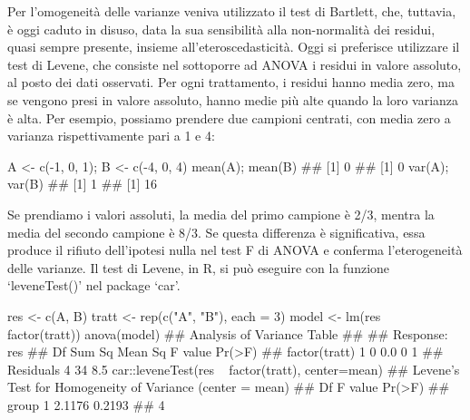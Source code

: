 \documentclass[a4paper,12pt,oneside]{book}
\newenvironment{Shaded}{}{}
\newcommand{\KeywordTok}[1]{#1}
\newcommand{\DataTypeTok}[1]{#1}
\newcommand{\DecValTok}[1]{#1}
\newcommand{\StringTok}[1]{#1}
\newcommand{\CommentTok}[1]{#1}
\newcommand{\OperatorTok}[1]{#1}
\newcommand{\NormalTok}[1]{#1}
\begin{document}
Per l'omogeneità delle varianze veniva utilizzato il test di Bartlett, che, tuttavia, è oggi caduto in disuso, data la sua sensibilità alla non-normalità dei residui, quasi sempre presente, insieme all'eteroscedasticità. Oggi si preferisce utilizzare il test di Levene, che consiste nel sottoporre ad ANOVA i residui in valore assoluto, al posto dei dati osservati. Per ogni trattamento, i residui hanno media zero, ma se vengono presi in valore assoluto, hanno medie più alte quando la loro varianza è alta. Per esempio, possiamo prendere due campioni centrati, con media zero a varianza rispettivamente pari a 1 e 4:

\begin{Shaded}
\begin{Highlighting}[]
\NormalTok{A <-}\StringTok{ }\KeywordTok{c}\NormalTok{(}\OperatorTok{-}\DecValTok{1}\NormalTok{, }\DecValTok{0}\NormalTok{, }\DecValTok{1}\NormalTok{); B <-}\StringTok{ }\KeywordTok{c}\NormalTok{(}\OperatorTok{-}\DecValTok{4}\NormalTok{, }\DecValTok{0}\NormalTok{, }\DecValTok{4}\NormalTok{)}
\KeywordTok{mean}\NormalTok{(A); }\KeywordTok{mean}\NormalTok{(B)}
\CommentTok{## [1] 0}
\CommentTok{## [1] 0}
\KeywordTok{var}\NormalTok{(A); }\KeywordTok{var}\NormalTok{(B)}
\CommentTok{## [1] 1}
\CommentTok{## [1] 16}
\end{Highlighting}
\end{Shaded}

Se prendiamo i valori assoluti, la media del primo campione è 2/3, mentra la media del secondo campione è 8/3. Se questa differenza è significativa, essa produce il rifiuto dell'ipotesi nulla nel test F di ANOVA e conferma l'eterogeneità delle varianze. Il test di Levene, in R, si può eseguire con la funzione `leveneTest()' nel package `car'.

\begin{Shaded}
\begin{Highlighting}[]
\NormalTok{res <-}\StringTok{ }\KeywordTok{c}\NormalTok{(A, B)}
\NormalTok{tratt <-}\StringTok{ }\KeywordTok{rep}\NormalTok{(}\KeywordTok{c}\NormalTok{(}\StringTok{"A"}\NormalTok{, }\StringTok{"B"}\NormalTok{), }\DataTypeTok{each =} \DecValTok{3}\NormalTok{)}
\NormalTok{model <-}\StringTok{ }\KeywordTok{lm}\NormalTok{(res }\OperatorTok{~}\StringTok{ }\KeywordTok{factor}\NormalTok{(tratt))}
\KeywordTok{anova}\NormalTok{(model)}
\CommentTok{## Analysis of Variance Table}
\CommentTok{## }
\CommentTok{## Response: res}
\CommentTok{##               Df Sum Sq Mean Sq F value Pr(>F)}
\CommentTok{## factor(tratt)  1      0     0.0       0      1}
\CommentTok{## Residuals      4     34     8.5}
\NormalTok{car}\OperatorTok{::}\KeywordTok{leveneTest}\NormalTok{(res }\OperatorTok{~}\StringTok{ }\KeywordTok{factor}\NormalTok{(tratt), }\DataTypeTok{center=}\NormalTok{mean)}
\CommentTok{## Levene's Test for Homogeneity of Variance (center = mean)}
\CommentTok{##       Df F value Pr(>F)}
\CommentTok{## group  1  2.1176 0.2193}
\CommentTok{##        4}
\end{Highlighting}
\end{Shaded}
\end{document}
